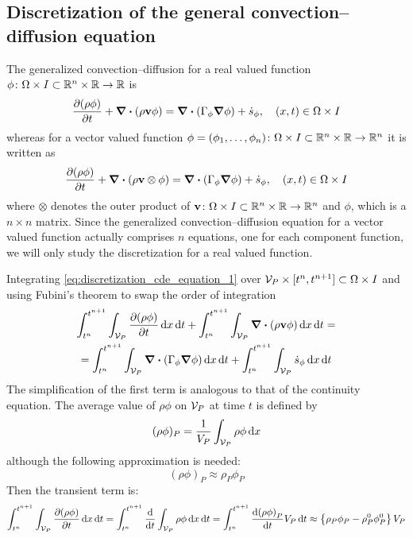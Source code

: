 
\subsection{Discretization of the general convection--diffusion equation}
\label{sec:discretization_general_cde}

The generalized convection--diffusion for a real valued function $\phi \colon
\Omega \times I \subset \mathbb{R}^n \times \mathbb{R} \rightarrow \mathbb{R}$ is
\begin{equation} \label{eq:discretization_cde_equation_1}
	\pdv{(\rho \phi)}{t} + \div(\rho \vb{v} \phi) = 
	\div(\Gamma_\phi \grad{\phi}) + \dot{s}_\phi,
	\quad (x, t) \in \Omega \times I
\end{equation}
whereas for a vector valued function $\phi = (\phi_1, \ldots, \phi_n) \colon
\Omega \times I \subset \mathbb{R}^n \times \mathbb{R} \rightarrow \mathbb{R}^n$ it is written
as
\begin{equation}
	\pdv{(\rho \phi)}{t} + \div(\rho \vb{v} \otimes \phi) = 
	\div(\Gamma_\phi \grad{\phi}) + \dot{s}_\phi,
	\quad (x, t) \in \Omega \times I
\end{equation}
where $\otimes$ denotes the outer product of $\vb{v} \colon \Omega \times I
\subset \mathbb{R}^n \times \mathbb{R} \rightarrow \mathbb{R}^n$ and $\phi$, which is a $n
\times n$ matrix. Since the generalized convection--diffusion equation for a
vector valued function actually comprises $n$ equations, one for each component
function, we will only study the discretization for a real valued function.

Integrating \eqref{eq:discretization_cde_equation_1} over $\mathcal{V}_{P} \times [t^n,
t^{n+1}] \subset \Omega \times I$ and using Fubini's theorem to swap the order
of integration
\begin{multline}
	\int_{t^n}^{t^{n+1}} \int_{\mathcal{V}_{P}} \pdv{(\rho \phi)}{t} \dd{x} \dd{t} + 
	\int_{t^n}^{t^{n+1}} \int_{\mathcal{V}_{P}} \div(\rho \vb{v} \phi) \dd{x} \dd{t} = \\ = 
	\int_{t^n}^{t^{n+1}} \int_{\mathcal{V}_{P}} \div(\Gamma_\phi \grad{\phi}) \dd{x} \dd{t} +
	\int_{t^n}^{t^{n+1}} \int_{\mathcal{V}_{P}} \dot{s}_\phi \dd{x} \dd{t}	
\end{multline}
The simplification of the first term is analogous to that of the continuity
equation. The average value of $\rho \phi$ on $\mathcal{V}_{P}$ at time $t$ is defined by
\begin{equation}
	(\rho \phi)_P = \frac{1}{V_P} \int_{\mathcal{V}_{P}} \rho \phi \dd{x}
\end{equation}
although the following approximation is needed:
\begin{equation}
	(\rho \phi)_P \approx \rho_P \phi_P
\end{equation}
Then the transient term is:
\begin{equation}
	\int_{t^n}^{t^{n+1}} \int_{\mathcal{V}_{P}} \pdv{(\rho \phi)}{t} \dd{x} \dd{t} = 
	\int_{t^n}^{t^{n+1}} \frac{\dd}{\dd{t}} \int_{\mathcal{V}_{P}} \rho \phi \dd{x} \dd{t} =  
	\int_{t^n}^{t^{n+1}} \frac{\dd(\rho \phi)_P}{\dd{t}} V_P \dd{t} \approx 
	\left\{ \rho_P \phi_P - \rho_P^0 \phi_P^0 \right\} V_P
\end{equation}

